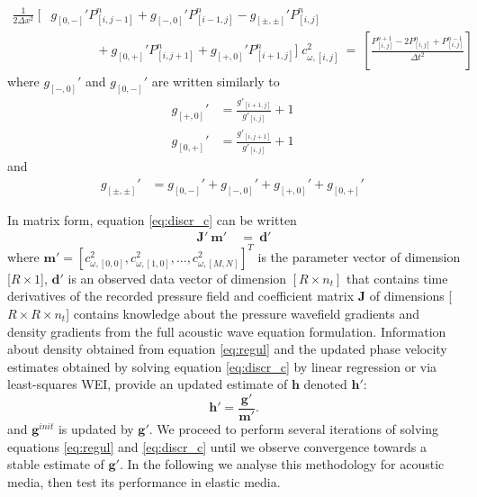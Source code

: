 \documentclass[]{article}
\begin{document}
	\begin{equation}
		\begin{split} \label{eq:discr_c} 
			\frac{1}{2 \Delta x^{2}} \: \Big[ &g_{[0,-]}' P_{[i,j-1]}^{n} + g_{[-,0]}' P_{[i-1,j]}^{n}
			-  g_{[\pm,\pm]}' P_{[i,j]}^{n} \\
			&\quad \quad \quad \; \; + g_{[0,+]}' P_{[i,j+1]}^{n} + g_{[+,0]}' P_{[i+1,j]}^{n} \Big] \; c_{\omega,[i,j]}^{2}
			\: = \: \left[ \frac{ P^{n+1}_{[i,j]} - 2P_{[i,j]}^{n} + P^{n-1}_{[i,j]} }{\Delta t^{2}} \right]
		\end{split}
	\end{equation}
	where $g_{[-,0]}'$ and $g_{[0,-]}'$ are written similarly to
	\begin{align}
	g_{[+,0]}'     &= \frac{g'_{[i+1,j]}}{g'_{[i,j]}}+1 \: \label{ratio1} \\ 
	g_{[0,+]}'     &= \frac{g'_{[i,j+1]}}{g'_{[i,j]}}+1 \:  \label{ratio2}
	\end{align}
	and
	\begin{align}
	g_{[\pm,\pm]}' &= g_{[0,-]}' + g_{[-,0]}' +  g_{[+,0]}' +  g_{[0,+]}' \: \label{rho_coeffs}  \nonumber
	\end{align}


	In matrix form, equation \eqref{eq:discr_c} can be written
	\begin{align}
		\bm{J}' \: \bm{m}' &\: = \: \bm{d'}
	\end{align}
	where  $ \mathbf{m}' = [c_{\omega,[0,0]}^{2}, c_{\omega,[1,0]}^{2},..., c_{\omega,[M,N]}^{2}]^{T}$ is the parameter vector of dimension [$R \times 1$], $\mathbf{d'}$ is an observed data vector of dimension $[R \times n_{t}]$ that contains time derivatives of the recorded pressure field and coefficient matrix $\bm{J}$ of dimensions [$R \times R \times n_{t}$] contains  knowledge about the pressure wavefield gradients and density gradients from the full acoustic wave equation formulation. Information about density obtained from equation \eqref{eq:regul} and the updated phase velocity estimates obtained by solving equation \eqref{eq:discr_c} by linear regression or via least-squares WEI, provide an updated estimate of $\bm{h}$ denoted $\bm{h}'$:
	\begin{equation}
		\bm{h}' = \frac{\bm{g}'}{\bm{m}'}.
	\end{equation}
	and $\bm{g}^{init}$ is updated by $\bm{g}'$. We proceed to perform several iterations of solving equations \eqref{eq:regul} and \eqref{eq:discr_c} until we observe convergence towards a stable estimate of $\bm{g}'$. In the following we analyse this methodology for acoustic media, then test its performance in elastic media. %
	
\end{document}

